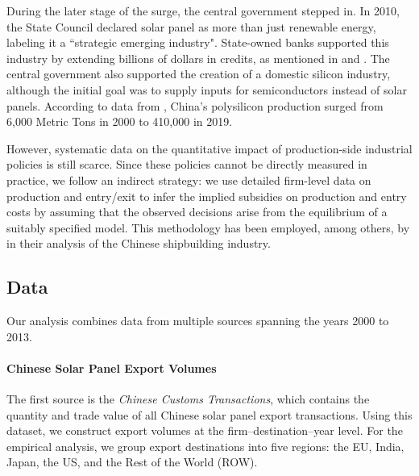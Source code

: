 \documentclass[12pt, letter]{article}
\begin{document}
During the later stage of the surge, the central government stepped in. In 2010, the State Council declared solar panel as more than just renewable energy, labeling it a ``strategic emerging industry". State-owned banks supported this industry by extending billions of dollars in credits, as mentioned in \cite{lexology2010strategic} and \cite{nahm2023state}. The central government also supported the creation of a domestic silicon industry, although the initial goal was to supply inputs for semiconductors instead of solar panels. According to data from \cite{waferpro_2024_china_silicon_supply}, China's polysilicon production surged from 6,000 Metric Tons in 2000 to 410,000 in 2019. %

However, systematic data on the quantitative impact of production-side industrial policies is still scarce. Since these policies cannot be directly measured in practice, we follow an indirect strategy: we use detailed firm-level data on production and entry/exit to infer the implied subsidies on production and entry costs by assuming that the observed decisions arise from the equilibrium of a suitably specified model. This methodology has been employed, among others, by \citet{barwick2025industrial} in their analysis of the Chinese shipbuilding industry.


\subsection{Data}
\label{subsec:inst_data}

Our analysis combines data from multiple sources spanning the years 2000 to 2013. 

\paragraph{Chinese Solar Panel Export Volumes}
The first source is the \textit{Chinese Customs Transactions}, which contains the quantity and trade value of all Chinese solar panel export transactions. Using this dataset, we construct export volumes at the firm–destination–year level. For the empirical analysis, we group export destinations into five regions: the EU, India, Japan, the US, and the Rest of the World (ROW).
\end{document}
